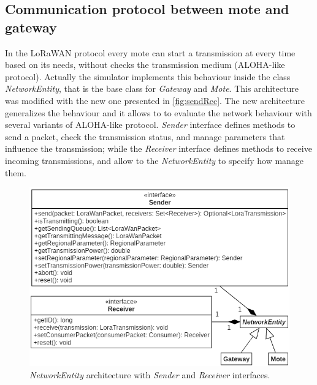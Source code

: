 \subsection{Communication protocol between mote and gateway}
In the LoRaWAN protocol every mote can start a transmission at every time based on its needs, without checks the transmission medium (ALOHA-like protocol).
Actually the simulator implements this behaviour inside the class \mbox{\textit{NetworkEntity}}, that is the base class for \mbox{\textit{Gateway}} and \mbox{\textit{Mote}}. 
This architecture was modified with the new one presented in \autoref{fig:sendRec}. 
The new architecture generalizes the behaviour and it allows to to evaluate the network behaviour with several variants of ALOHA-like protocol.
\mbox{\textit{Sender}} interface defines methods to send a packet, check the transmission status, and manage parameters that influence the transmission; while the \mbox{\textit{Receiver}} interface defines methods to receive incoming transmissions, and allow to the \mbox{\textit{NetworkEntity}} to specify how manage them.
\begin{figure}[h]
    \centering
    \includegraphics{figures/sendRec.png}
    \caption{\mbox{\textit{NetworkEntity}} architecture with \mbox{\textit{Sender}} and \mbox{\textit{Receiver}} interfaces.}
    \label{fig:sendRec}
\end{figure}

